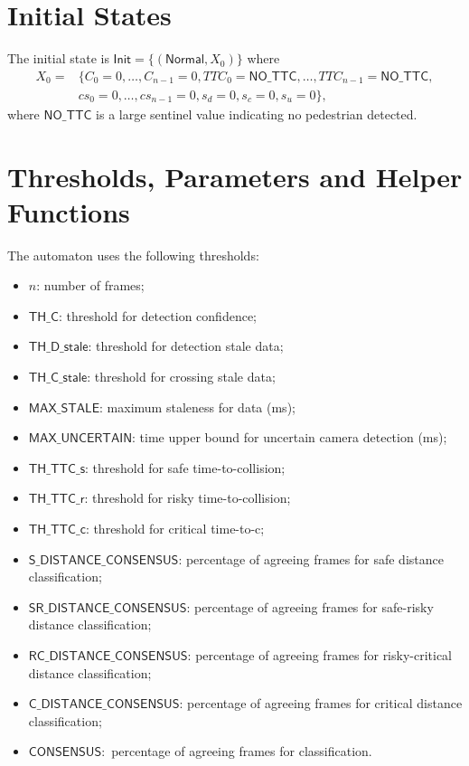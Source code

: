 \documentclass[12pt]{article}
\theoremstyle{definition}
\begin{document}
\section{Initial States}
The initial state is 
\(\mathsf{Init} = \{(\mathsf{Normal}, X_0)\}\)
where 
\[
\begin{aligned}
    X_0 = &\{C_0 = 0, \ldots, C_{n-1} = 0, TTC_0 = \mathsf{NO\_TTC}, \ldots, TTC_{n-1} = \mathsf{NO\_TTC}, \\
            &cs_0 = 0, \ldots, cs_{n-1} = 0, s_d = 0, s_c = 0, s_u = 0\},
\end{aligned}
\]
where $\mathsf{NO\_TTC}$ is a large sentinel value indicating no pedestrian detected.


\section{Thresholds, Parameters and Helper Functions}

The automaton uses the following thresholds:
\begin{itemize}
    \item $n$: number of frames;
    \item $\mathsf{TH\_C}$: threshold for detection confidence;
    \item $\mathsf{TH\_D\_stale}$: threshold for detection stale data;
    \item $\mathsf{TH\_C\_stale}$: threshold for crossing stale data;
    \item $\mathsf{MAX\_STALE}$: maximum staleness for data (ms);
    \item $\mathsf{MAX\_UNCERTAIN}$: time upper bound for uncertain camera detection (ms);
    \item $\mathsf{TH\_TTC\_s}$: threshold for safe time-to-collision;
    \item $\mathsf{TH\_TTC\_r}$: threshold for risky time-to-collision;
    \item $\mathsf{TH\_TTC\_c}$: threshold for critical time-to-c;
    \item $\mathsf{S\_DISTANCE\_CONSENSUS}$: percentage of agreeing frames for safe distance classification; 
    \item $\mathsf{SR\_DISTANCE\_CONSENSUS}$: percentage of agreeing frames for safe-risky distance classification;
    \item $\mathsf{RC\_DISTANCE\_CONSENSUS}$: percentage of agreeing frames for risky-critical distance classification;
    \item $\mathsf{C\_DISTANCE\_CONSENSUS}$: percentage of agreeing frames for critical distance classification;
    \item $\mathsf{CONSENSUS}: $ percentage of agreeing frames for classification.
\end{itemize}
\end{document}
